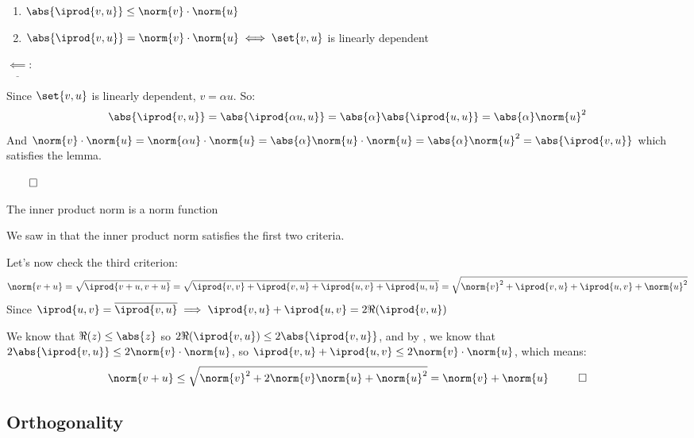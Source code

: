 \documentclass[10pt]{article}
\begin{document}
\begin{lemma}{\begin{enumerate}
    \item $\abs{\iprod{v,u}}\leq\norm{v}\cdot\norm{u}$
    \item $\abs{\iprod{v,u}}=\norm{v}\cdot\norm{u}\iff\set{v,u}$ is linearly dependent
\end{enumerate}}
\begin{enumerate}
\begin{minipage}[t]{\dimexpr\textwidth-3cm}
    \end{minipage}
    
    $\underline{\impliedby}$: \begin{minipage}[t]{\dimexpr\textwidth-3cm}
    
    Since $\set{v,u}$ is linearly dependent, $v=\alpha u$. So:
    \[ \abs{\iprod{v,u}} = \abs{\iprod{\alpha u, u}} = \abs{\alpha}\abs{\iprod{u,u}} = \abs{\alpha}\norm{u}^2 \]
    And $\norm{v}\cdot\norm{u}=\norm{\alpha u}\cdot\norm{u}=\abs{\alpha}\norm{u}\cdot\norm{u}=\abs{\alpha}\norm{u}^2=\abs{\iprod{v,u}}$ which satisfies the lemma.
    
    \end{minipage}
    
\end{enumerate}

$\qed$

\end{lemma}

\begin{theorem}{The inner product norm is a norm function}

We saw in  that the inner product norm satisfies the first two criteria.

Let's now check the third criterion:
\[ \norm{v+u} = \sqrt{\iprod{v+u,v+u}} = \sqrt{\iprod{v,v}+\iprod{v,u}+\iprod{u,v}+\iprod{u,u}} = \sqrt{\norm{v}^2 + \iprod{v,u}+\iprod{u,v} + \norm{u}^2} \]
Since $\iprod{u,v}=\overline{\iprod{v,u}}\implies \iprod{v,u}+\iprod{u,v} = 2\Re(\iprod{v,u})$

We know that $\Re(z)\leq\abs{z}$ so $2\Re(\iprod{v,u})\leq2\abs{\iprod{v,u}}$, and by , we know that $2\abs{\iprod{v,u}}\leq2\norm{v}\cdot\norm{u}$, so $\iprod{v,u}+\iprod{u,v}\leq2\norm{v}\cdot\norm{u}$, which means:
\[ \norm{v+u} \leq \sqrt{\norm{v}^2+2\norm{v}\norm{u}+\norm{u}^2} = \norm{v}+\norm{u} ~~ \qed \]

\end{theorem}

\newpage
\subsection{Orthogonality}
\end{document}
